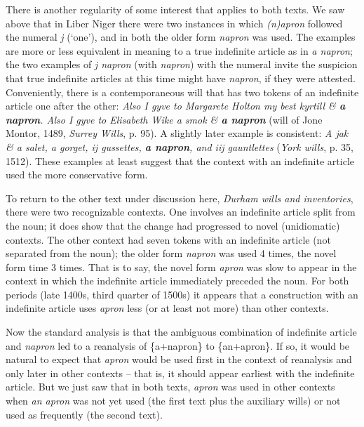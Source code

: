 \documentclass[output=paper,
modfonts
]{LSP/langsci}
\begin{document}
There is another regularity of some interest that applies to both texts.
We saw above that in Liber Niger there were two instances in which
\emph{(n)apron} followed the numeral \emph{j} (`one'), and in both the
older form \emph{napron} was used. The examples are more or less
equivalent in meaning to a true indefinite article as in \emph{a
napron}; the two examples of \emph{j napron} (with \emph{napron}) with
the numeral invite the suspicion that true indefinite articles at this
time might have \emph{napron}, if they were attested. Conveniently,
there is a contemporaneous will that has two tokens of an indefinite
article one after the other: \emph{Also I gyve to Margarete Holton my
best kyrtill \& \textbf{a napron}. Also I gyve to Elisabeth Wike a smok
\& \textbf{a napron}} (will of Jone Montor, 1489, \emph{Surrey Wills},
p. 95). A slightly later example is consistent: \emph{A jak \& a salet,
a gorget, ij gussettes, \textbf{a napron}, and iij gauntlettes}
(\emph{York wills}, p. 35, 1512). These examples at least suggest that
the context with an indefinite article used the more conservative form.

To return to the other text under discussion here, \textit{Durham wills and
inventories}, there were two recognizable contexts. One involves an
indefinite article split from the noun; it does show that the change had
progressed to novel (unidiomatic) contexts. The other context had seven
tokens with an indefinite article (not separated from the noun); the
older form \emph{napron} was used 4 times, the novel form time 3 times.
That is to say, the novel form \emph{apron} was slow to appear in the
context in which the indefinite article immediately preceded the noun.
For both periods (late 1400s, third quarter of 1500s) it appears that a
construction with an indefinite article uses \emph{apron} less (or at
least not more) than other contexts.

Now the standard analysis is that the ambiguous combination of
indefinite article and \emph{napron} led to a reanalysis of \{a+napron\}
to \{an+apron\}. If so, it would be natural to expect that \emph{apron}
would be used first in the context of reanalysis and only later in other
contexts -- that is, it should appear earliest with the indefinite
article. But we just saw that in both texts, \emph{apron} was used in
other contexts when \emph{an apron} was not yet used (the first text
plus the auxiliary wills) or not used as frequently (the second text).
\end{document}

